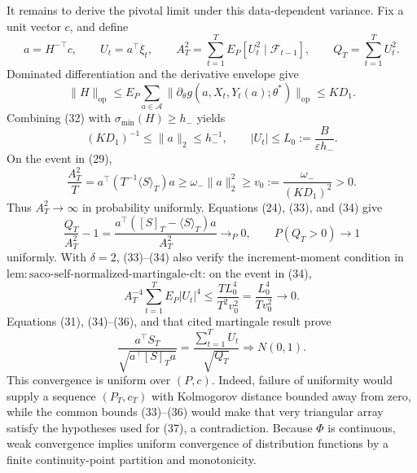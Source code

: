 It remains to derive the pivotal limit under this data-dependent variance. Fix a unit vector \(c\), and define
\[
 a=H^{-\top}c,\qquad U_t=a^\top\xi_t,\qquad
 A_T^2=\sum_{t=1}^TE_P[U_t^2\mid\mathcal F_{t-1}],\qquad
 Q_T=\sum_{t=1}^TU_t^2.
\tag{31}
\]
Dominated differentiation and the derivative envelope give
\[
 \|H\|_{\mathrm{op}}
 \le E_P\sum_{a\in\mathcal A}\|\partial_\theta g(a,X_t,Y_t(a);\theta^*)\|_{\mathrm{op}}
 \le KD_1.
\tag{32}
\]
Combining (32) with \(\sigma_{\min}(H)\ge h_-\) yields
\[
 (KD_1)^{-1}\le\|a\|_2\le h_-^{-1},
 \qquad |U_t|\le L_0:=\frac{B}{\varepsilon h_-}.
\tag{33}
\]
On the event in (29),
\[
 \frac{A_T^2}{T}
 =a^\top(T^{-1}\langle S\rangle_T)a
 \ge\omega_-\|a\|_2^2
 \ge v_0:=\frac{\omega_-}{(KD_1)^2}>0.
\tag{34}
\]
Thus \(A_T^2\to\infty\) in probability uniformly. Equations (24), (33), and (34) give
\[
 \frac{Q_T}{A_T^2}-1
 =\frac{a^\top([S]_T-\langle S\rangle_T)a}{A_T^2}
 \longrightarrow_P0,
 \qquad P(Q_T>0)\longrightarrow1
\tag{35}
\]
uniformly. With \(\delta=2\), (33)--(34) also verify the increment-moment condition in \(\mathrm{lem:saco\text{-}self\text{-}normalized\text{-}martingale\text{-}clt}\): on the event in (34),
\[
 A_T^{-4}\sum_{t=1}^TE_P|U_t|^4
 \le \frac{TL_0^4}{T^2v_0^2}
 =\frac{L_0^4}{Tv_0^2}\longrightarrow0.
\tag{36}
\]
Equations (31), (34)--(36), and that cited martingale result prove
\[
 \frac{a^\top S_T}{\sqrt{a^\top[S]_Ta}}
 =\frac{\sum_{t=1}^TU_t}{\sqrt{Q_T}}
 \Rightarrow N(0,1).
\tag{37}
\]
This convergence is uniform over \((P,c)\). Indeed, failure of uniformity would supply a sequence \((P_T,c_T)\) with Kolmogorov distance bounded away from zero, while the common bounds (33)--(36) would make that very triangular array satisfy the hypotheses used for (37), a contradiction. Because \(\Phi\) is continuous, weak convergence implies uniform convergence of distribution functions by a finite continuity-point partition and monotonicity.

